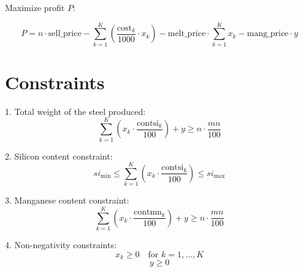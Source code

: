 \documentclass{article}
\begin{document}
Maximize profit \( P \):

\[
P = n \cdot \text{sell\_price} - \sum_{k=1}^K \left( \frac{\text{cost}_k}{1000} \cdot x_k \right) - \text{melt\_price} \cdot \sum_{k=1}^K x_k - \text{mang\_price} \cdot y
\]

\section*{Constraints}

1. Total weight of the steel produced:
\[
\sum_{k=1}^K \left( x_k \cdot \frac{\text{contsi}_k}{100} \right) + y \geq n \cdot \frac{mn}{100}
\]

2. Silicon content constraint:
\[
si_{\text{min}} \leq \sum_{k=1}^K \left( x_k \cdot \frac{\text{contsi}_k}{100} \right) \leq si_{\text{max}}
\]

3. Manganese content constraint:
\[
\sum_{k=1}^K \left( x_k \cdot \frac{\text{contmn}_k}{100} \right) + y \geq n \cdot \frac{mn}{100}
\]

4. Non-negativity constraints:
\[
x_k \geq 0 \quad \text{for } k = 1, \ldots, K
\]
\[
y \geq 0
\]
\end{document}

